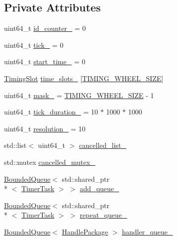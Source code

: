 \subsection*{Private Attributes}
\begin{DoxyCompactItemize}
\item 
uint64\-\_\-t \hyperlink{classapollo_1_1cyber_1_1TimingWheel_a7272e1fa44240d3d33321eff5d441fe1}{id\-\_\-counter\-\_\-} = 0
\item 
uint64\-\_\-t \hyperlink{classapollo_1_1cyber_1_1TimingWheel_aad6f68c7f2482a7332f2a25feacc57ea}{tick\-\_\-} = 0
\item 
uint64\-\_\-t \hyperlink{classapollo_1_1cyber_1_1TimingWheel_ad65efbe24adcdf04dd52aa9eec5a7762}{start\-\_\-time\-\_\-} = 0
\item 
\hyperlink{classapollo_1_1cyber_1_1TimingSlot}{Timing\-Slot} \hyperlink{classapollo_1_1cyber_1_1TimingWheel_a9dbb67035af423a67b8b725d80ba2920}{time\-\_\-slots\-\_\-} \mbox{[}\hyperlink{namespaceapollo_1_1cyber_a708c544333efd71eb0b9439a18a297bf}{T\-I\-M\-I\-N\-G\-\_\-\-W\-H\-E\-E\-L\-\_\-\-S\-I\-Z\-E}\mbox{]}
\item 
uint64\-\_\-t \hyperlink{classapollo_1_1cyber_1_1TimingWheel_ae6970ce0519654e6b35376b0c305af22}{mask\-\_\-} = \hyperlink{namespaceapollo_1_1cyber_a708c544333efd71eb0b9439a18a297bf}{T\-I\-M\-I\-N\-G\-\_\-\-W\-H\-E\-E\-L\-\_\-\-S\-I\-Z\-E} -\/ 1
\item 
uint64\-\_\-t \hyperlink{classapollo_1_1cyber_1_1TimingWheel_adc7be44d7a193c980ee29aebe6153d14}{tick\-\_\-duration\-\_\-} = 10 $\ast$ 1000 $\ast$ 1000
\item 
uint64\-\_\-t \hyperlink{classapollo_1_1cyber_1_1TimingWheel_a8575c041956dc3bbb58bc1289af64339}{resolution\-\_\-} = 10
\item 
std\-::list$<$ uint64\-\_\-t $>$ \hyperlink{classapollo_1_1cyber_1_1TimingWheel_a27a4106601246fcdbeec1e73d470138f}{cancelled\-\_\-list\-\_\-}
\item 
std\-::mutex \hyperlink{classapollo_1_1cyber_1_1TimingWheel_a09c73b028934c0770a436942e5cf08c4}{cancelled\-\_\-mutex\-\_\-}
\item 
\hyperlink{classapollo_1_1cyber_1_1base_1_1BoundedQueue}{Bounded\-Queue}$<$ std\-::shared\-\_\-ptr\\*
$<$ \hyperlink{classapollo_1_1cyber_1_1TimerTask}{Timer\-Task} $>$ $>$ \hyperlink{classapollo_1_1cyber_1_1TimingWheel_a0ffa403e6ddc38490dfc17dc1a76fa90}{add\-\_\-queue\-\_\-}
\item 
\hyperlink{classapollo_1_1cyber_1_1base_1_1BoundedQueue}{Bounded\-Queue}$<$ std\-::shared\-\_\-ptr\\*
$<$ \hyperlink{classapollo_1_1cyber_1_1TimerTask}{Timer\-Task} $>$ $>$ \hyperlink{classapollo_1_1cyber_1_1TimingWheel_ada62c50c8f74816280c5a67bacd13c29}{repeat\-\_\-queue\-\_\-}
\item 
\hyperlink{classapollo_1_1cyber_1_1base_1_1BoundedQueue}{Bounded\-Queue}$<$ \hyperlink{structapollo_1_1cyber_1_1HandlePackage}{Handle\-Package} $>$ \hyperlink{classapollo_1_1cyber_1_1TimingWheel_aa090a8f5dcd4b1e420a7c621e133906f}{handler\-\_\-queue\-\_\-}
\end{DoxyCompactItemize}


